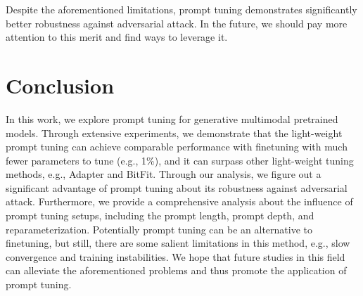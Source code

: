 \documentclass[11pt]{article}
\begin{document}
Despite the aforementioned limitations, prompt tuning demonstrates significantly better robustness against adversarial attack. 
In the future, we should pay more attention to this merit and find ways to leverage it. 


\section{Conclusion}
In this work, we explore prompt tuning for generative multimodal pretrained models.  
Through extensive experiments, we demonstrate that the light-weight prompt tuning can achieve comparable performance with finetuning with much fewer parameters to tune (e.g., 1\%), and it can surpass other light-weight tuning methods, e.g., Adapter and BitFit. 
Through our analysis, we figure out a significant advantage of prompt tuning about its robustness against adversarial attack. 
Furthermore, we provide a comprehensive analysis about the influence of prompt tuning setups, including the prompt length, prompt depth, and reparameterization. 
Potentially prompt tuning can be an alternative to finetuning, but still, there are some salient limitations in this method, e.g., slow convergence and training instabilities. 
We hope that future studies in this field can alleviate the aforementioned problems and thus promote the application of prompt tuning.
%
 
\end{document}
